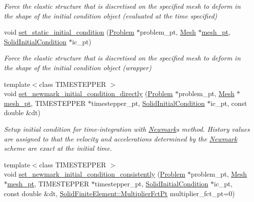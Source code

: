 \begin{DoxyCompactItemize}
\begin{DoxyCompactList}\small\item\em Force the elastic structure that is discretised on the specified mesh to deform in the shape of the initial condition object (evaluated at the time specified) \end{DoxyCompactList}\item 
void \hyperlink{classoomph_1_1SolidICProblem_ae5ba8df393fa9d08ac12200ef4c7e293}{set\+\_\+static\+\_\+initial\+\_\+condition} (\hyperlink{classoomph_1_1Problem}{Problem} $\ast$problem\+\_\+pt, \hyperlink{classoomph_1_1Mesh}{Mesh} $\ast$\hyperlink{classoomph_1_1Problem_aad122d70a22dc5302cfd5853d3cf3057}{mesh\+\_\+pt}, \hyperlink{classoomph_1_1SolidInitialCondition}{Solid\+Initial\+Condition} $\ast$ic\+\_\+pt)
\begin{DoxyCompactList}\small\item\em Force the elastic structure that is discretised on the specified mesh to deform in the shape of the initial condition object (wrapper) \end{DoxyCompactList}\item 
{\footnotesize template$<$class T\+I\+M\+E\+S\+T\+E\+P\+P\+ER $>$ }\\void \hyperlink{classoomph_1_1SolidICProblem_ac88248cf3c1b9353724deb2e0d0e1f39}{set\+\_\+newmark\+\_\+initial\+\_\+condition\+\_\+directly} (\hyperlink{classoomph_1_1Problem}{Problem} $\ast$problem\+\_\+pt, \hyperlink{classoomph_1_1Mesh}{Mesh} $\ast$\hyperlink{classoomph_1_1Problem_aad122d70a22dc5302cfd5853d3cf3057}{mesh\+\_\+pt}, T\+I\+M\+E\+S\+T\+E\+P\+P\+ER $\ast$timestepper\+\_\+pt, \hyperlink{classoomph_1_1SolidInitialCondition}{Solid\+Initial\+Condition} $\ast$ic\+\_\+pt, const double \&dt)
\begin{DoxyCompactList}\small\item\em Setup initial condition for time-\/integration with \hyperlink{classoomph_1_1Newmark}{Newmark}\textquotesingle{}s method. History values are assigned to that the velocity and accelerations determined by the \hyperlink{classoomph_1_1Newmark}{Newmark} scheme are exact at the initial time. \end{DoxyCompactList}\item 
{\footnotesize template$<$class T\+I\+M\+E\+S\+T\+E\+P\+P\+ER $>$ }\\void \hyperlink{classoomph_1_1SolidICProblem_a07e954c951e4eefa7ac7c99ba74e81cc}{set\+\_\+newmark\+\_\+initial\+\_\+condition\+\_\+consistently} (\hyperlink{classoomph_1_1Problem}{Problem} $\ast$problem\+\_\+pt, \hyperlink{classoomph_1_1Mesh}{Mesh} $\ast$\hyperlink{classoomph_1_1Problem_aad122d70a22dc5302cfd5853d3cf3057}{mesh\+\_\+pt}, T\+I\+M\+E\+S\+T\+E\+P\+P\+ER $\ast$timestepper\+\_\+pt, \hyperlink{classoomph_1_1SolidInitialCondition}{Solid\+Initial\+Condition} $\ast$ic\+\_\+pt, const double \&dt, \hyperlink{classoomph_1_1SolidFiniteElement_a1ec1cdf98041a51f77aab2b892856fc4}{Solid\+Finite\+Element\+::\+Multiplier\+Fct\+Pt} multiplier\+\_\+fct\+\_\+pt=0)

\end{DoxyCompactItemize}
